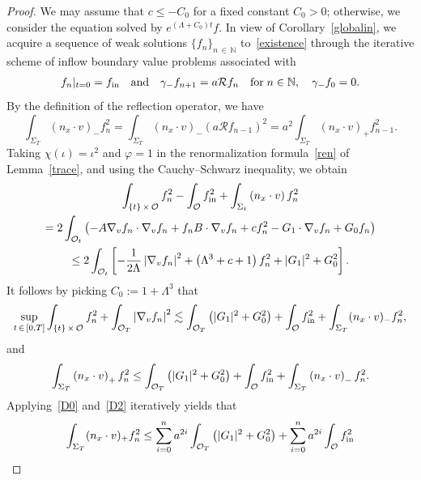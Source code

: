 \documentclass[AHL,Unicode,longabstracts,published]{cedram}
\newcommand*\fin {f_{\rm in}}
\newcommand*\N {\mathbb{N}}
\newcommand*\RR {\mathcal{R}}
\newcommand*\OO {\mathcal{O}}
\begin{document}
\begin{proof}
We may assume that $c\le -C_0$ for a fixed constant $C_0>0$; otherwise, we consider the equation solved by $e^{(\Lambda+C_0)t}f$. In view of Corollary~\ref{globalin}, we acquire a sequence of weak solutions $\{f_n\}_{n\,\in\,\N}$ to~\eqref{existence} through the iterative scheme of inflow boundary value problems associated with
\begin{align*}
f_n|_{t=0}=\fin\quad\text{and}\quad
\gamma_-f_{n+1}=a\RR f_{n}\quad\text{for}\;n\in\N, \quad
\gamma_-f_0=0.
\end{align*}
By the definition of the reflection operator, we have
\begin{equation}\label{D0}
\int_{\Sigma_T} (n_x\cdot v)_-f_n^2 = \int_{\Sigma_T} (n_x\cdot v)_-\left(a\RR f_{n-1}\right)^2 = a^2\int_{\Sigma_T} (n_x\cdot v)_+f_{n-1}^2.
\end{equation}
Taking $\chi(\iota)=\iota^2$ and $\varphi=1$ in the renormalization formula~\eqref{ren} of Lemma~\ref{trace}, and using the Cauchy--Schwarz inequality, we obtain
\begin{multline*}
\int_{\{t\}\,\times\,\OO} f_n^2 - \int_{\OO}\fin^2 + \int_{\Sigma_t} \left(n_x\cdot v\right) f_n^2 \\
=2\int_{\OO_t} \left(-A\nabla_vf_n \cdot\nabla_vf_n + f_nB\cdot\nabla_vf_n + c f_n^2 - G_1\cdot\nabla_vf_n + G_0f_n \right)\\
\le 2\int_{\OO_t} \left[-\frac{1}{2\Lambda}\left|\nabla_vf_n\right|^2 + \left(\Lambda^3+c+1\right)f_n^2 + |G_1|^2 + G_0^2\right].
\end{multline*}
It follows by picking $C_0:=1+\Lambda^3$ that
\begin{equation}\label{D1}
\sup_{t\,\in\,[0,T]}\int_{\{t\}\,\times\,\OO} f_n^2 + \int_{\OO_T} \left|\nabla_vf_n\right|^2
\lesssim \int_{\OO_T}\left(|G_1|^2 + G_0^2\right) + \int_{\OO}\fin^2 + \int_{\Sigma_T} (n_x\cdot v)_-f_n^2,
\end{equation}
and
\begin{equation}\label{D2}
\int_{\Sigma_T} \left(n_x\cdot v\right)_+f_n^2
\le \int_{\OO_T}\left(|G_1|^2 + G_0^2\right) + \int_{\OO}\fin^2 + \int_{\Sigma_T} \left(n_x\cdot v\right)_-f_n^2.
\end{equation}
Applying~\eqref{D0} and~\eqref{D2} iteratively yields that
\begin{equation}\label{Diterat}
\begin{split}
\int_{\Sigma_T} (n_x\cdot v)_+f_n^2
\le \sum_{i=0}^{n} a^{2i} \int_{\OO_T}\left(|G_1|^2 + G_0^2\right) + \sum_{i=0}^{n} a^{2i} \int_{\OO}\fin^2 &\\

\end{split}
\end{equation}
\end{proof}
\end{document}
